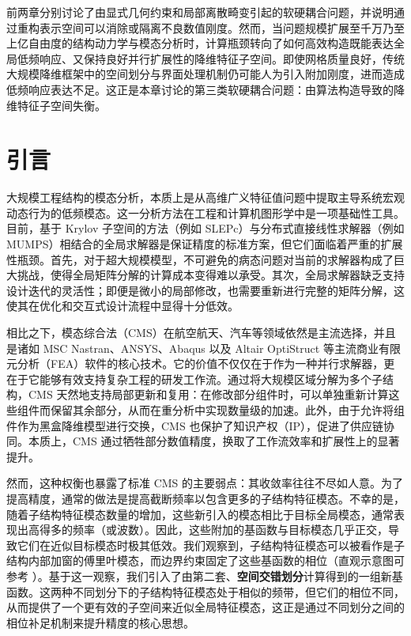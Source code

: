前两章分别讨论了由显式几何约束和局部离散畸变引起的软硬耦合问题，并说明通过重构表示空间可以消除或隔离不良数值刚度。然而，当问题规模扩展至千万乃至上亿自由度的结构动力学与模态分析时，计算瓶颈转向了如何高效构造既能表达全局低频响应、又保持良好并行扩展性的降维特征子空间。即使网格质量良好，传统大规模降维框架中的空间划分与界面处理机制仍可能人为引入附加刚度，进而造成低频响应表达不足。这正是本章讨论的第三类软硬耦合问题：由算法构造导致的降维特征子空间失衡。

\section{引言}

大规模工程结构的模态分析，本质上是从高维广义特征值问题中提取主导系统宏观动态行为的低频模态。这一分析方法在工程和计算机图形学中是一项基础性工具。目前，基于 Krylov 子空间的方法（例如 SLEPc\cite{Hernandez2005SLEPc}）与分布式直接线性求解器（例如 MUMPS\cite{MUMPS:1, MUMPS:2}）相结合的全局求解器是保证精度的标准方案，但它们面临着严重的扩展性瓶颈。首先，对于超大规模模型，不可避免的病态问题对当前的求解器构成了巨大挑战，使得全局矩阵分解的计算成本变得难以承受。其次，全局求解器缺乏支持设计迭代的灵活性；即便是微小的局部修改，也需要重新进行完整的矩阵分解，这使其在优化和交互式设计流程中显得十分低效。

相比之下，模态综合法（CMS）在航空航天、汽车等领域依然是主流选择，并且是诸如 MSC Nastran、ANSYS、Abaqus 以及 Altair OptiStruct\cite{Vysok2017CurrentCO} 等主流商业有限元分析（FEA）软件的核心技术。它的价值不仅仅在于作为一种并行求解器，更在于它能够有效支持复杂工程的研发工作流。通过将大规模区域分解为多个子结构，CMS 天然地支持局部更新和复用：在修改部分组件时，可以单独重新计算这些组件而保留其余部分，从而在重分析中实现数量级的加速。此外，由于允许将组件作为黑盒降维模型进行交换，CMS 也保护了知识产权（IP），促进了供应链协同。本质上，CMS 通过牺牲部分数值精度，换取了工作流效率和扩展性上的显著提升。

然而，这种权衡也暴露了标准 CMS 的主要弱点：\textcolor{IsConclusion}{其收敛率往往不尽如人意。}为了提高精度，通常的做法是提高截断频率以包含更多的子结构特征模态。\textcolor{ExplainConclusion}{不幸的是，随着子结构特征模态数量的增加，这些新引入的模态相比于目标全局模态，通常表现出高得多的频率（或波数）。因此，这些附加的基函数与目标模态几乎正交，导致它们在近似目标模态时极其低效。}我们观察到，子结构特征模态可以被看作是子结构内部加窗的傅里叶模态，而边界约束固定了这些基函数的相位（直观示意图可参考 ）。基于这一观察，我们引入了由第二套、\textbf{空间交错划分}计算得到的一组新基函数。这两种不同划分下的子结构特征模态处于相似的频带，但它们的相位不同，从而提供了一个更有效的子空间来近似全局特征模态，这正是通过不同划分之间的相位补足机制来提升精度的核心思想。

